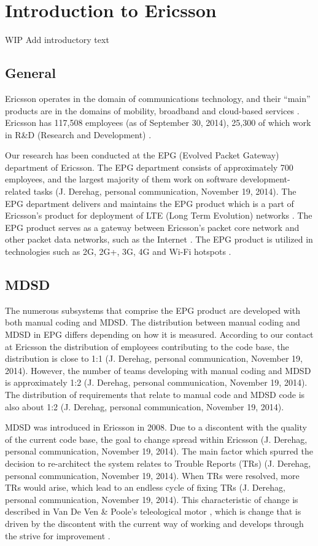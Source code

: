 \documentclass[final_report_innit.tex]{subfiles}
\begin{document}
\section{Introduction to Ericsson}
WIP
Add introductory text

\subsection*{General}
Ericsson operates in the domain of communications technology, and their “main” products are in the domains of mobility, broadband and cloud-based services \cite{etc, ecf}. Ericsson has 117,508 employees (as of September 30, 2014), 25,300 of which work in R\&D (Research and Development) \cite{etc}.

Our research has been conducted at the EPG (Evolved Packet Gateway) department of Ericsson. The EPG department consists of approximately 700 employees, and the largest majority of them work on software development-related tasks (J. Derehag, personal communication, November 19, 2014). The EPG department delivers and maintains the EPG product which is a part of Ericsson’s product for deployment of LTE (Long Term Evolution) networks \cite{eepg}. The EPG product serves as a gateway between Ericsson’s packet core network and other packet data networks, such as the Internet \cite{eepg}. The EPG product is utilized in technologies such as 2G, 2G+, 3G, 4G and Wi-Fi hotspots \cite{eepg}.

\subsection*{MDSD}
The numerous subsystems that comprise the EPG product are developed with both manual coding and MDSD. The distribution between manual coding and MDSD in EPG differs depending on how it is measured. According to our contact at Ericsson the distribution of employees contributing to the code base, the distribution is close to 1:1 (J. Derehag, personal communication, November 19, 2014). However, the number of teams developing with manual coding and MDSD is approximately 1:2 (J. Derehag, personal communication, November 19, 2014). The distribution of requirements that relate to manual code and MDSD code is also about 1:2 (J. Derehag, personal communication, November 19, 2014).

MDSD was introduced in Ericsson in 2008. Due to a discontent with the quality of the current code base, the goal to change spread within Ericsson (J. Derehag, personal communication, November 19, 2014). The main factor which spurred the decision to re-architect the system relates to Trouble Reports (TRs) (J. Derehag, personal communication, November 19, 2014). When TRs were resolved, more TRs would arise, which lead to an endless cycle of fixing TRs (J. Derehag, personal communication, November 19, 2014). This characteristic of change is described in Van De Ven \& Poole’s teleological motor \cite{van1995explaining}, which is change that is driven by the discontent with the current way of working and develops through the strive for improvement \cite{van1995explaining}. 
\end{document}
